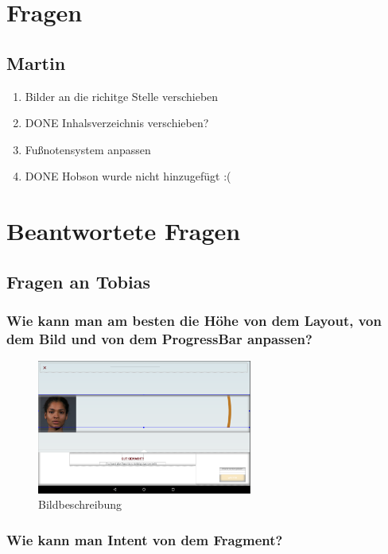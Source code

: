 
\section{Fragen}
\subsection{Martin}
\begin{enumerate}
    \item Bilder an die richitge Stelle verschieben
    \item DONE Inhalsverzeichnis verschieben?
    \item Fußnotensystem anpassen
    \item DONE Hobson wurde nicht hinzugefügt :(
\end{enumerate}
\section{Beantwortete Fragen}
\subsection{Fragen an Tobias}
\subsubsection{Wie kann man am besten die Höhe von dem Layout, von dem Bild und von dem ProgressBar anpassen?}
\begin{figure}
\centering\includegraphics[width=200pt]{res/1.PNG}
\caption{Bildbeschreibung}
\end{figure}

\subsubsection{Wie kann man Intent von dem Fragment?}
